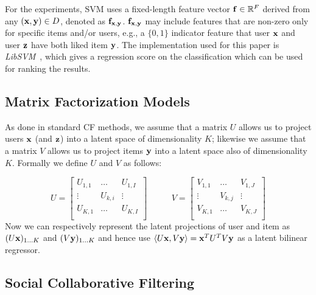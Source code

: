For the experiments, SVM uses a fixed-length feature vector
$\mathbf{f} \in \mathbb{R}^F$ derived from any $(\mathbf{x},\mathbf{y}) \in D$, denoted
as $\mathbf{f}_{\mathbf{x},\mathbf{y}}$.  $\mathbf{f}_{\mathbf{x},\mathbf{y}}$ may include features
that are non-zero only for specific items and/or users, e.g., a $\{0,1\}$ 
indicator feature that user $\mathbf{x}$
and user $\mathbf{z}$ have both liked item $\mathbf{y}$.  The implementation used for this paper is \emph{LibSVM}~\cite{libsvm}, which gives a regression score on the classification which can be used for ranking the results.

\subsection{Matrix Factorization Models}

As done in standard CF methods, we assume that
a matrix $U$ allows us to project users $\mathbf{x}$ (and $\mathbf{z}$)
into a latent space of dimensionality $K$; likewise we assume that
a matrix $V$ allows us to project items $\mathbf{y}$ into a latent
space also of dimensionality $K$.  Formally we define $U$ and $V$
as follows:

\begin{equation*}
U = 
\begin{bmatrix}
  U_{1,1} & \hdots  & U_{1,I} \\
  \vdots  & U_{k,i} & \vdots  \\
  U_{K,1} & \hdots  & U_{K,I} \\
\end{bmatrix}
\qquad \; \; \;
V = 
\begin{bmatrix}
  V_{1,1} & \hdots  & V_{1,J} \\
  \vdots  & V_{k,j} & \vdots  \\
  V_{K,1} & \hdots  & V_{K,J} \\
\end{bmatrix}
\end{equation*}
Now we can respectively represent the latent projections of user and
item as $(U \mathbf{x})_{1 \ldots K}$ and $(V \mathbf{y})_{1 \ldots K}$ and
hence use $\langle U \mathbf{x}, V \mathbf{y} \rangle = \mathbf{x}^T U^T V \mathbf{y}$ as a latent bilinear regressor. 




\subsection{Social Collaborative Filtering}

